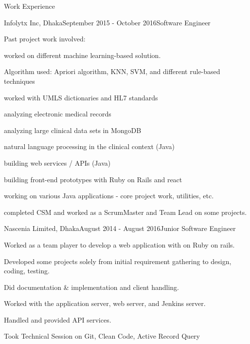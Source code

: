 \documentclass{resume} %
\begin{document}
\begin{rSection}{Work Experience}
\begin{rSubsection}{Infolytx Inc, Dhaka}{September 2015 - October 2016}{Software Engineer}{}
\item Past project work involved: 
\item worked on different machine learning-based solution. 
\item Algorithm used:  Apriori algorithm, KNN, SVM, and different rule-based techniques 
\item worked with UMLS dictionaries and HL7 standards
\item analyzing electronic medical records
\item analyzing large clinical data sets in MongoDB
\item natural language processing in the clinical context (Java)
\item building web services / APIs (Java)
\item building front-end prototypes with  Ruby on Rails and react
\item working on various Java applications - core project work, utilities, etc.
\item completed CSM and worked as a ScrumMaster and Team Lead on some projects.
\end{rSubsection}
\newpage
\begin{rSubsection}{Nascenia Limited, Dhaka}{August 2014 - August 2016}{Junior Software Engineer}{}
\item Worked as a team player to develop a web application with on Ruby on rails.
\item Developed some projects solely from initial requirement gathering to design, coding, testing.
\item Did documentation \& implementation and client handling.
\item Worked with the application server, web server, and Jenkins server.
\item Handled and provided API services. 
\item Took Technical Session on Git, Clean Code, Active Record Query 
\end{rSubsection}

\end{rSection}



\end{document}
